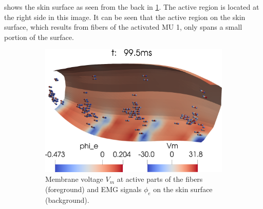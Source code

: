  shows the skin surface as seen from the back in \cref{fig:mu01a}. The active region is located at the right side in this image.
It can be seen that the active region on the skin surface, which results from fibers of the activated MU 1, only spans a small portion of the surface.

\begin{figure}[H]
  \centering%
  \begin{subfigure}[t]{0.7\textwidth}%
    \centering%
    \includegraphics[width=\textwidth]{images/results/application/mu01a.png}%
    \caption{Membrane voltage $V_m$ at active parts of the fibers (foreground) and EMG signals $\phi_e$ on the skin surface (background).}%
    \label{fig:mu01a}%
  \end{subfigure} \,
  \begin{subfigure}[t]{0.25\textwidth}%
    \centering%

\end{subfigure}
\end{figure}
